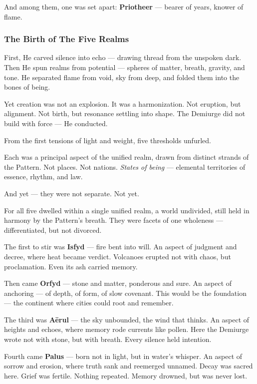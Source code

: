 \documentclass[12pt]{article}
\begin{document}
And among them, one was set apart:  
\textbf{Priotheer} --- bearer of years, knower of flame.

\dotfill

\subsubsection{The Birth of The Five Realms}

First, He carved silence into echo --- drawing thread from the unspoken dark.  
Then He spun realms from potential --- spheres of matter, breath, gravity, and tone.  
He separated flame from void, sky from deep, and folded them into the bones of being.

Yet creation was not an explosion. It was a harmonization.  
Not eruption, but alignment. Not birth, but resonance settling into shape.  
The Demiurge did not build with force --- He conducted.

From the first tensions of light and weight, five thresholds unfurled.

Each was a principal aspect of the unified realm,  
drawn from distinct strands of the Pattern.  
Not places. Not nations.  
\textit{States of being} --- elemental territories of essence, rhythm, and law.

And yet --- they were not separate.  
Not yet.

For all five dwelled within a single unified realm,  
a world undivided, still held in harmony by the Pattern's breath.  
They were facets of one wholeness ---  
differentiated, but not divorced.

The first to stir was \textbf{Isfyd} --- fire bent into will.  
An aspect of judgment and decree, where heat became verdict.  
Volcanoes erupted not with chaos, but proclamation.  
Even its ash carried memory.

Then came \textbf{Orfyd} --- stone and matter, ponderous and sure.  
An aspect of anchoring --- of depth, of form, of slow covenant.  
This would be the foundation --- the continent where cities could root and remember.

The third was \textbf{Aērul} --- the sky unbounded, the wind that thinks.  
An aspect of heights and echoes, where memory rode currents like pollen.  
Here the Demiurge wrote not with stone, but with breath.  
Every silence held intention.

Fourth came \textbf{Palus} --- born not in light, but in water's whisper.  
An aspect of sorrow and erosion, where truth sank and reemerged unnamed.  
Decay was sacred here. Grief was fertile. Nothing repeated.  
Memory drowned, but was never lost.
\end{document}
